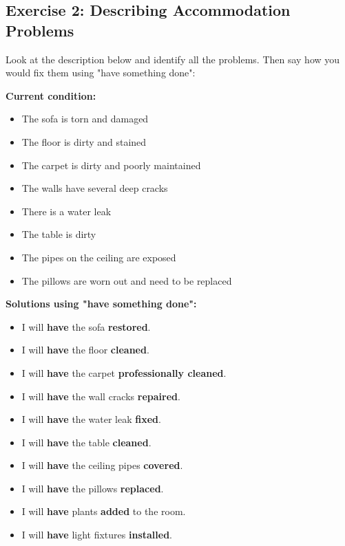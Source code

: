 \subsection{Exercise 2: Describing Accommodation Problems}

Look at the description below and identify all the problems. Then say how you would fix them using "have something done":

\begin{readingbox}[title=Problem Accommodation]
\textbf{Current condition:}
\begin{itemize}
    \item The sofa is torn and damaged
    \item The floor is dirty and stained
    \item The carpet is dirty and poorly maintained
    \item The walls have several deep cracks
    \item There is a water leak
    \item The table is dirty
    \item The pipes on the ceiling are exposed
    \item The pillows are worn out and need to be replaced
\end{itemize}
\end{readingbox}

\textbf{Solutions using "have something done":}
\begin{itemize}
    \item I will \textbf{have} the sofa \textbf{restored}.
    \item I will \textbf{have} the floor \textbf{cleaned}.
    \item I will \textbf{have} the carpet \textbf{professionally cleaned}.
    \item I will \textbf{have} the wall cracks \textbf{repaired}.
    \item I will \textbf{have} the water leak \textbf{fixed}.
    \item I will \textbf{have} the table \textbf{cleaned}.
    \item I will \textbf{have} the ceiling pipes \textbf{covered}.
    \item I will \textbf{have} the pillows \textbf{replaced}.
    \item I will \textbf{have} plants \textbf{added} to the room.
    \item I will \textbf{have} light fixtures \textbf{installed}.
\end{itemize}

